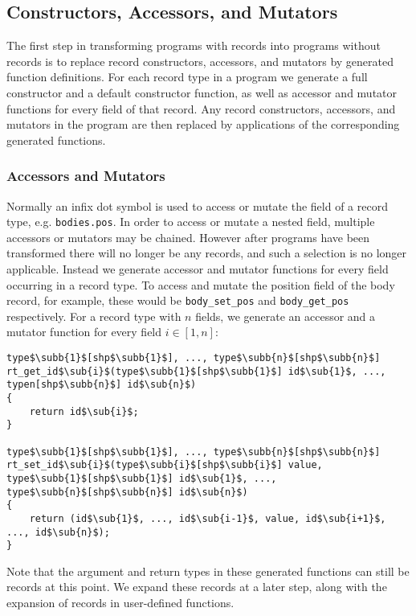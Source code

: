 
\subsection{Constructors, Accessors, and Mutators}

The first step in transforming programs with records into programs without records is to replace record constructors, accessors, and mutators by generated function definitions.
For each record type in a program we generate a full constructor and a default constructor function, as well as accessor and mutator functions for every field of that record.
Any record constructors, accessors, and mutators in the program are then replaced by applications of the corresponding generated functions.

\subsubsection{Accessors and Mutators}

Normally an infix dot symbol is used to access or mutate the field of a record type, e.g. \texttt{bodies.pos}.
In order to access or mutate a nested field, multiple accessors or mutators may be chained.
However after programs have been transformed there will no longer be any records, and such a selection is no longer applicable.
Instead we generate accessor and mutator functions for every field occurring in a record type.
To access and mutate the position field of the body record, for example, these would be \verb|body_set_pos| and \verb|body_get_pos| respectively.
For a record type with $n$ fields, we generate an accessor and a mutator function for every field $i\in[1,n]$:
%
\begin{lstlisting}[escapechar=$]
type$\subb{1}$[shp$\subb{1}$], ..., type$\subb{n}$[shp$\subb{n}$]
rt_get_id$\sub{i}$(type$\subb{1}$[shp$\subb{1}$] id$\sub{1}$, ..., typen[shp$\subb{n}$] id$\sub{n}$)
{
    return id$\sub{i}$;
}

type$\subb{1}$[shp$\subb{1}$], ..., type$\subb{n}$[shp$\subb{n}$]
rt_set_id$\sub{i}$(type$\subb{i}$[shp$\subb{i}$] value, type$\subb{1}$[shp$\subb{1}$] id$\sub{1}$, ..., type$\subb{n}$[shp$\subb{n}$] id$\sub{n}$)
{
    return (id$\sub{1}$, ..., id$\sub{i-1}$, value, id$\sub{i+1}$, ..., id$\sub{n}$);
}
\end{lstlisting}
%
Note that the argument and return types in these generated functions can still be records at this point.
We expand these records at a later step, along with the expansion of records in user-defined functions.

